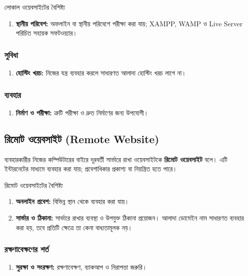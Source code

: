 \begin{keypointbox}{লোকাল ওয়েবসাইটের বৈশিষ্ট্য}
\begin{enumerate}
\item \textbf{স্থানীয় পরিবেশ:} অফলাইন বা স্থানীয় পরিবেশে পরীক্ষা করা যায়; XAMPP, WAMP ও Live Server পরিচিত সহায়ক সফটওয়্যার।
\end{enumerate}
\end{keypointbox}
\subsubsection{সুবিধা}
\begin{enumerate}
\item \textbf{হোস্টিং খরচ:} নিজের যন্ত্র ব্যবহার করলে সাধারণত আলাদা হোস্টিং খরচ লাগে না।
\end{enumerate}
\subsubsection{ব্যবহার}
\begin{enumerate}
\item \textbf{নির্মাণ ও পরীক্ষা:} ত্রুটি পরীক্ষা ও দ্রুত নির্মাণের জন্য উপযোগী।
\end{enumerate}

\subsection{রিমোট ওয়েবসাইট (Remote Website)}
\begin{definitionbox}{}
ব্যবহারকারীর নিজের কম্পিউটারের বাইরে দূরবর্তী সার্ভারে রাখা ওয়েবসাইটকে \textbf{রিমোট ওয়েবসাইট} বলে। এটি ইন্টারনেটের মাধ্যমে ব্যবহার করা যায়; প্রবেশাধিকার প্রকাশ্য বা নিয়ন্ত্রিত হতে পারে।
\end{definitionbox}

\begin{keypointbox}{রিমোট ওয়েবসাইটের বৈশিষ্ট্য}
\begin{enumerate}
\item \textbf{অনলাইন প্রবেশ:} বিভিন্ন স্থান থেকে ব্যবহার করা যায়।
\item \textbf{সার্ভার ও ঠিকানা:} সার্ভারে রাখার ব্যবস্থা ও উপযুক্ত ঠিকানা প্রয়োজন। আলাদা ডোমেইন নাম সাধারণত ব্যবহার করা হয়, তবে প্রতিটি ক্ষেত্রে তা কেনা বাধ্যতামূলক নয়।
\end{enumerate}
\end{keypointbox}
\subsubsection{রক্ষণাবেক্ষণের শর্ত}
\begin{enumerate}
\item \textbf{সুরক্ষা ও সংরক্ষণ:} রক্ষণাবেক্ষণ, ব্যাকআপ ও নিরাপত্তা জরুরি।
\end{enumerate}

